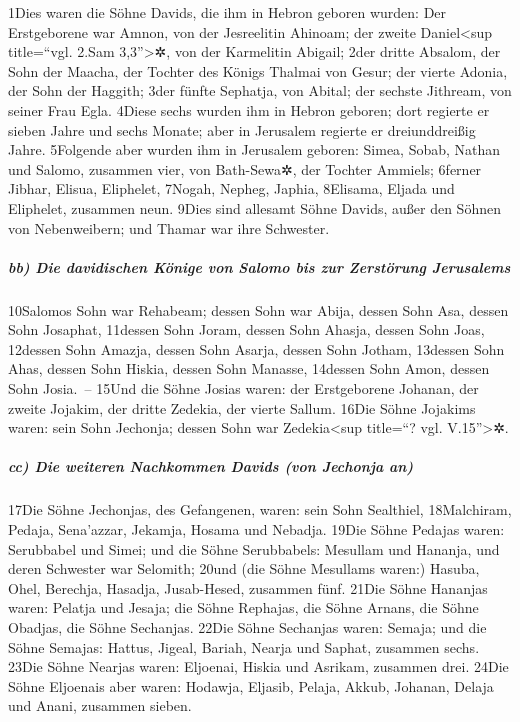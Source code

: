 1Dies waren die Söhne Davids, die ihm in Hebron geboren wurden: Der
Erstgeborene war Amnon, von der Jesreelitin Ahinoam; der zweite
Daniel\textless sup title=``vgl. 2.Sam 3,3''\textgreater✲, von der
Karmelitin Abigail; 2der dritte Absalom, der Sohn der Maacha, der
Tochter des Königs Thalmai von Gesur; der vierte Adonia, der Sohn der
Haggith; 3der fünfte Sephatja, von Abital; der sechste Jithream, von
seiner Frau Egla. 4Diese sechs wurden ihm in Hebron geboren; dort
regierte er sieben Jahre und sechs Monate; aber in Jerusalem regierte er
dreiunddreißig Jahre. 5Folgende aber wurden ihm in Jerusalem geboren:
Simea, Sobab, Nathan und Salomo, zusammen vier, von Bath-Sewa✲, der
Tochter Ammiels; 6ferner Jibhar, Elisua, Eliphelet, 7Nogah, Nepheg,
Japhia, 8Elisama, Eljada und Eliphelet, zusammen neun. 9Dies sind
allesamt Söhne Davids, außer den Söhnen von Nebenweibern; und Thamar war
ihre Schwester.

\hypertarget{bb-die-davidischen-kuxf6nige-von-salomo-bis-zur-zerstuxf6rung-jerusalems}{%
\subparagraph{bb) Die davidischen Könige von Salomo bis zur Zerstörung
Jerusalems}\label{bb-die-davidischen-kuxf6nige-von-salomo-bis-zur-zerstuxf6rung-jerusalems}}

10Salomos Sohn war Rehabeam; dessen Sohn war Abija, dessen Sohn Asa,
dessen Sohn Josaphat, 11dessen Sohn Joram, dessen Sohn Ahasja, dessen
Sohn Joas, 12dessen Sohn Amazja, dessen Sohn Asarja, dessen Sohn Jotham,
13dessen Sohn Ahas, dessen Sohn Hiskia, dessen Sohn Manasse, 14dessen
Sohn Amon, dessen Sohn Josia.~-- 15Und die Söhne Josias waren: der
Erstgeborene Johanan, der zweite Jojakim, der dritte Zedekia, der vierte
Sallum. 16Die Söhne Jojakims waren: sein Sohn Jechonja; dessen Sohn war
Zedekia\textless sup title=``? vgl. V.15''\textgreater✲.

\hypertarget{cc-die-weiteren-nachkommen-davids-von-jechonja-an}{%
\subparagraph{cc) Die weiteren Nachkommen Davids (von Jechonja
an)}\label{cc-die-weiteren-nachkommen-davids-von-jechonja-an}}

17Die Söhne Jechonjas, des Gefangenen, waren: sein Sohn Sealthiel,
18Malchiram, Pedaja, Sena'azzar, Jekamja, Hosama und Nebadja. 19Die
Söhne Pedajas waren: Serubbabel und Simei; und die Söhne Serubbabels:
Mesullam und Hananja, und deren Schwester war Selomith; 20und (die Söhne
Mesullams waren:) Hasuba, Ohel, Berechja, Hasadja, Jusab-Hesed, zusammen
fünf. 21Die Söhne Hananjas waren: Pelatja und Jesaja; die Söhne
Rephajas, die Söhne Arnans, die Söhne Obadjas, die Söhne Sechanjas.
22Die Söhne Sechanjas waren: Semaja; und die Söhne Semajas: Hattus,
Jigeal, Bariah, Nearja und Saphat, zusammen sechs. 23Die Söhne Nearjas
waren: Eljoenai, Hiskia und Asrikam, zusammen drei. 24Die Söhne
Eljoenais aber waren: Hodawja, Eljasib, Pelaja, Akkub, Johanan, Delaja
und Anani, zusammen sieben.

